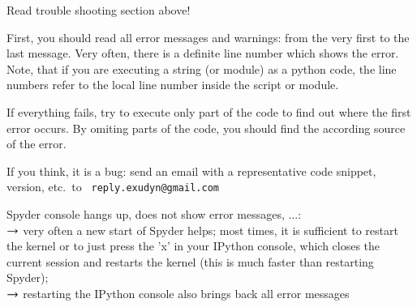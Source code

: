 	\bi
	\item[$\ra$] Read trouble shooting section above!	
	\item[$\ra$] First, you should read all error messages and warnings: from the very first to the last message. Very often, there is a definite line number which shows the error. Note, that if you are executing a string (or module) as a python code, the line numbers refer to the local line number inside the script or module.
	\item[$\ra$] If everything fails, try to execute only part of the code to find out where the first error occurs. By omiting parts of the code, you should find the according source of the error.
	\item[$\ra$] If you think, it is a bug: send an email with a representative code snippet, version, etc.\ to \texttt{ reply.exudyn@gmail.com}
	\ei
  \item Spyder console hangs up, does not show error messages, ...:\\
	$\ra$ very often a new start of Spyder helps; most times, it is sufficient to restart the kernel or to just press the 'x' in your IPython console, which closes the current session and restarts the kernel (this is much faster than restarting Spyder); \\
	$\ra$ restarting the IPython console also brings back all error messages
	
